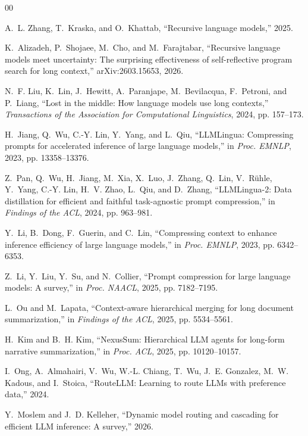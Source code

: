 \documentclass[conference]{IEEEtran}
\begin{document}
\begin{thebibliography}{00}

A.~L. Zhang, T.~Kraska, and O.~Khattab, ``Recursive language models,'' 2025.

K.~Alizadeh, P.~Shojaee, M.~Cho, and M.~Farajtabar, ``Recursive language
models meet uncertainty: The surprising effectiveness of self-reflective
program search for long context,'' arXiv:2603.15653, 2026.

N.~F. Liu, K.~Lin, J.~Hewitt, A.~Paranjape, M.~Bevilacqua, F.~Petroni, and
P.~Liang, ``Lost in the middle: How language models use long contexts,''
\emph{Transactions of the Association for Computational Linguistics}, 2024,
pp. 157--173.

H.~Jiang, Q.~Wu, C.-Y. Lin, Y.~Yang, and L.~Qiu, ``LLMLingua: Compressing
prompts for accelerated inference of large language models,'' in
\emph{Proc. EMNLP}, 2023, pp. 13358--13376.

Z.~Pan, Q.~Wu, H.~Jiang, M.~Xia, X.~Luo, J.~Zhang, Q.~Lin, V.~R\"uhle,
Y.~Yang, C.-Y. Lin, H.~V. Zhao, L.~Qiu, and D.~Zhang, ``LLMLingua-2: Data
distillation for efficient and faithful task-agnostic prompt compression,''
in \emph{Findings of the ACL}, 2024, pp. 963--981.

Y.~Li, B.~Dong, F.~Guerin, and C.~Lin, ``Compressing context to enhance
inference efficiency of large language models,'' in \emph{Proc. EMNLP}, 2023,
pp. 6342--6353.

Z.~Li, Y.~Liu, Y.~Su, and N.~Collier, ``Prompt compression for large language
models: A survey,'' in \emph{Proc. NAACL}, 2025, pp. 7182--7195.

L.~Ou and M.~Lapata, ``Context-aware hierarchical merging for long document
summarization,'' in \emph{Findings of the ACL}, 2025, pp. 5534--5561.

H.~Kim and B.~H. Kim, ``NexusSum: Hierarchical LLM agents for long-form
narrative summarization,'' in \emph{Proc. ACL}, 2025, pp. 10120--10157.

I.~Ong, A.~Almahairi, V.~Wu, W.-L. Chiang, T.~Wu, J.~E. Gonzalez, M.~W.
Kadous, and I.~Stoica, ``RouteLLM: Learning to route LLMs with preference
data,'' 2024.

Y.~Moslem and J.~D. Kelleher, ``Dynamic model routing and cascading for
efficient LLM inference: A survey,'' 2026.


\end{thebibliography}
\end{document}
